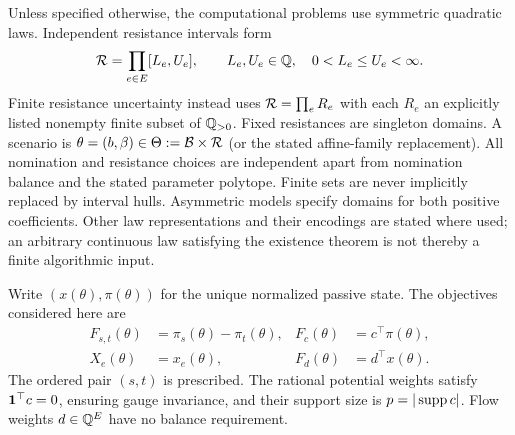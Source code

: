 Unless specified otherwise, the computational problems use symmetric
quadratic laws. Independent resistance intervals form
\[
 \mathcal{R}=\prod_{e\in E}[L_e,U_e],\qquad
 L_e,U_e\in\mathbb{Q},\quad 0<L_e\le U_e<\infty.
\]
Finite resistance uncertainty instead uses
$\mathcal{R}=\prod_e R_e$ with each $R_e$ an explicitly listed nonempty
finite subset of $\mathbb{Q}_{>0}$. Fixed resistances are singleton domains.
A scenario is $\theta=(b,\beta)\in\Theta:=\mathcal{B}\times\mathcal{R}$ (or the
stated affine-family replacement). All nomination and resistance choices
are independent apart from nomination balance and the stated parameter
polytope. Finite sets are never implicitly replaced by interval hulls.
Asymmetric models specify domains for both positive coefficients.
Other law representations and their encodings are stated where used;
an arbitrary continuous law satisfying the existence theorem is not
thereby a finite algorithmic input.

Write $(x(\theta),\pi(\theta))$ for the unique normalized passive state.
The objectives considered here are
\[
 \begin{aligned}
 F_{s,t}(\theta)&=\pi_s(\theta)-\pi_t(\theta),
 &F_c(\theta)&=c^\top\pi(\theta),\\
 X_e(\theta)&=x_e(\theta), &F_d(\theta)&=d^\top x(\theta).
 \end{aligned}
\]
The ordered pair $(s,t)$ is prescribed. The rational potential weights
satisfy $\mathbf{1}^\top c=0$, ensuring gauge invariance, and their support size
is $p=|\operatorname{supp} c|$. Flow weights $d\in\mathbb{Q}^E$ have no balance requirement.

